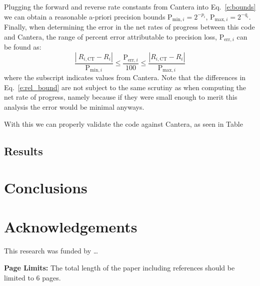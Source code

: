 \documentclass[12pt]{ussci}
\begin{document}
Plugging the forward and reverse rate constants from Cantera into Eq.~\eqref{e:bounds} we can obtain a reasonable a-priori precision bounds $\text{P}_{\text{min},i} = 2^{-p_i}$, $\text{P}_{\text{max},i} = 2^{-q_i}$.
Finally, when determining the error in the net rates of progress between this code and Cantera, the range of percent error attributable to precision loss, $\text{P}_{\text{err},i}$ can be found as:
\begin{equation}
\frac{\left\lvert\ R_{i,\text{CT}} - R_{i}\right\rvert}{\text{P}_{\text{min},i}} \le
\frac{\text{P}_{\text{err},i}}{100} \le \frac{\left\lvert R_{i,\text{CT}} - R_{i} \right\rvert}{\text{P}_{\text{max},i}}
\label{e:rel_bound}
\end{equation}
where the  subscript indicates values from Cantera.
Note that the differences in Eq.~\eqref{e:rel_bound} are not subject to the same scrutiny as when computing the net rate of progress, namely because if they were small enough to merit this analysis the error would be minimal anyways.

With this we can properly validate the code against Cantera, as seen in Table~

\subsection{Results}
\label{S:results}


\label{results}

\section{Conclusions}
%

\section{Acknowledgements}
This research was funded by \ldots

\noindent\textbf{Page Limits:} The total length of the paper including references should be limited to 6 pages.

\printbibliography[heading=bibintoc]
\end{document}
